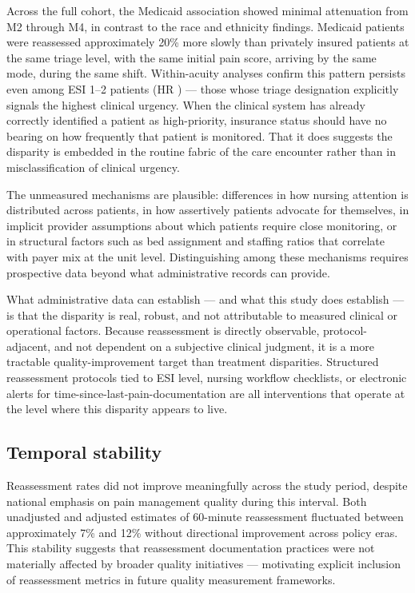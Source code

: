 Across the full cohort, the Medicaid association showed minimal attenuation from M2 through M4, in contrast to the race and ethnicity findings.
Medicaid patients were reassessed approximately 20\% more slowly than privately insured patients at the same triage level, with the same initial pain score, arriving by the same mode, during the same shift.
Within-acuity analyses confirm this pattern persists even among ESI 1--2 patients (HR \HRMedicaidESIhigh{}) --- those whose triage designation explicitly signals the highest clinical urgency.
When the clinical system has already correctly identified a patient as high-priority, insurance status should have no bearing on how frequently that patient is monitored.
That it does suggests the disparity is embedded in the routine fabric of the care encounter rather than in misclassification of clinical urgency.

The unmeasured mechanisms are plausible: differences in how nursing attention is distributed across patients, in how assertively patients advocate for themselves, in implicit provider assumptions about which patients require close monitoring, or in structural factors such as bed assignment and staffing ratios that correlate with payer mix at the unit level.
Distinguishing among these mechanisms requires prospective data beyond what administrative records can provide.

What administrative data can establish --- and what this study does establish --- is that the disparity is real, robust, and not attributable to measured clinical or operational factors.
Because reassessment is directly observable, protocol-adjacent, and not dependent on a subjective clinical judgment, it is a more tractable quality-improvement target than treatment disparities.
Structured reassessment protocols tied to ESI level, nursing workflow checklists, or electronic alerts for time-since-last-pain-documentation are all interventions that operate at the level where this disparity appears to live.

\subsection{Temporal stability}

Reassessment rates did not improve meaningfully across the study period, despite national emphasis on pain management quality during this interval.
Both unadjusted and adjusted estimates of 60-minute reassessment fluctuated between approximately 7\% and 12\% without directional improvement across policy eras.
This stability suggests that reassessment documentation practices were not materially affected by broader quality initiatives --- motivating explicit inclusion of reassessment metrics in future quality measurement frameworks.

